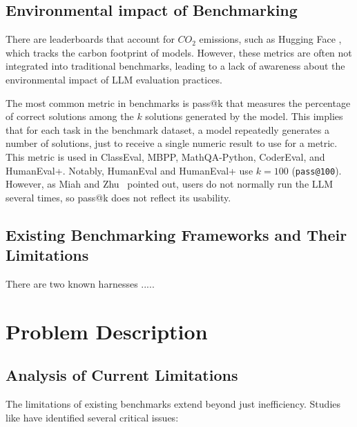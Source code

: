 \section{Environmental impact of Benchmarking}


There are leaderboards that account for $CO_2$ emissions, such as Hugging Face \cite{huggingfaceCalculation}, which tracks the carbon footprint of models. However, these metrics are often not integrated into traditional benchmarks, leading to a lack of awareness about the environmental impact of LLM evaluation practices.

The most common metric in benchmarks is pass@k that measures the percentage of correct solutions among the $k$ solutions generated by the model.
This implies that for each task in the benchmark dataset, a model repeatedly generates a number of solutions, just to receive a single numeric result to use for a metric.
This metric is used in ClassEval, MBPP, MathQA-Python, CoderEval, and HumanEval+.
Notably, HumanEval and HumanEval+ use $k=100$ (\texttt{pass@100}).
However, as Miah and Zhu~\cite{miah2024usercentricevaluationcode} pointed out, users do not normally run the LLM several times, so pass@k does not reflect its usability.

\section{Existing Benchmarking Frameworks and Their Limitations}
There are two known harnesses .....

\chapter{Problem Description}

\section{Analysis of Current Limitations}

The limitations of existing benchmarks extend beyond just inefficiency. Studies like  have identified several critical issues:

